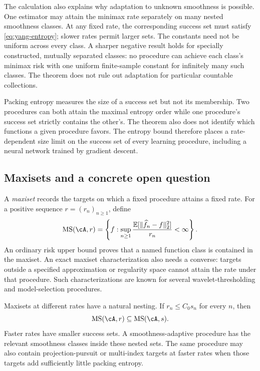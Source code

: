 \documentclass[11pt,twoside]{article}
\newcommand{\E}{\mathbb E}
\theoremstyle{definition}
\theoremstyle{remark}
\begin{document}
The calculation also explains why adaptation to unknown smoothness is
possible. One estimator may attain the minimax rate separately on many
nested smoothness classes. At any fixed rate, the corresponding success set
must satisfy \cref{eq:yang-entropy}; slower rates permit larger sets. The
constants need not be uniform across every class. A sharper negative result
holds for specially constructed, mutually separated classes:
no procedure can achieve each class's minimax risk with one uniform
finite-sample constant for infinitely many such classes. The theorem does
not rule out adaptation for particular countable collections.

Packing entropy measures the size of a success set but not its membership.
Two procedures can both attain the maximal entropy order while one
procedure's success set strictly contains the other's. The theorem also does
not identify which functions a given procedure favors. The entropy bound
therefore places a rate-dependent size limit on the success set of every
learning procedure, including a neural network trained by gradient descent.

\subsection{Maxisets and a concrete open question}
\label{sec:maxisets}

A \emph{maxiset} records the targets on which a fixed procedure attains a
fixed rate. For a positive sequence $r=(r_n)_{n\geq1}$, define
\begin{equation}
 \operatorname{MS}(\cA,r)
 =\left\{f:
 \sup_{n\geq1}
 \frac{\E[\|\widehat f_n-f\|_2^2]}{r_n}<\infty
 \right\}.
 \label{eq:maxiset}
\end{equation}
An ordinary risk upper bound proves that a named function class is contained
in the maxiset. An exact maxiset characterization also needs a converse:
targets outside a specified approximation or regularity space cannot attain
the rate under that procedure. Such characterizations are known for several
wavelet-thresholding and model-selection procedures.

Maxisets at different rates have a natural nesting. If
$r_n\leq C_0s_n$ for every $n$, then
\begin{equation}
 \operatorname{MS}(\cA,r)\subseteq\operatorname{MS}(\cA,s).
 \label{eq:maxiset-nesting}
\end{equation}
Faster rates have smaller success sets. A smoothness-adaptive procedure has
the relevant smoothness classes inside these nested sets. The same procedure
may also contain projection-pursuit or multi-index targets at faster rates
when those targets add sufficiently little packing entropy.
\end{document}
